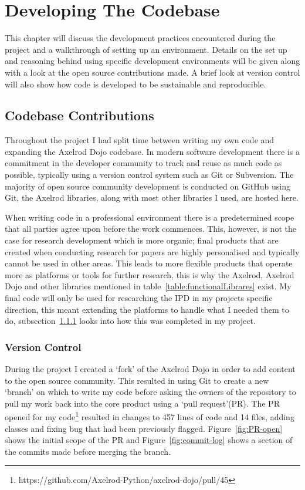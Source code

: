 \chapter{Developing The Codebase}\label{ch:developingthecodebase}
This chapter will discuss the development practices encountered during the project and a walkthrough of setting up an environment.
Details on the set up and reasoning behind using specific development environments will be given along with a look at the open source contributions made.
A brief look at version control will also show how code is developed to be sustainable and reproducible.

\section{Codebase Contributions}
Throughout the project I had split time between writing my own code and expanding the Axelrod Dojo codebase. 
In modern software development there is a commitment in the developer community to track and reuse as much code as possible, typically using a version control system such as Git or Subversion.
The majority of open source community development is conducted on GitHub\cite{GitHub} using Git, the Axelrod libraries, along with most other libraries I used, are hosted here.

When writing code in a professional environment there is a predetermined scope that all parties agree upon before the work commences.  This, however, is not the case for research development which is more organic;
final products that are created when conducting research for papers are highly personalised and typically cannot be used in other areas.
This leads to more flexible products that operate more as platforms or tools for further research, this is why the Axelrod, Axelrod Dojo and other libraries mentioned in table~\ref{table:functionalLibrares} exist.
My final code will only be used for researching the IPD in my projects specific direction, this meant extending the platforms to handle what I needed them to do, subsection~\ref{ssec:versioncontrol} looks into how this was completed in my project.

\subsection{Version Control}\label{ssec:versioncontrol}
During the project I created a `fork' of the Axelrod Dojo in order to add content to the open source community. 
This resulted in using Git to create a new `branch' on which to write my code before asking the owners of the repository to pull my work back into the core product using a `pull request'(PR).
The PR opened for my code\footnote{https://github.com/Axelrod-Python/axelrod-dojo/pull/45} resulted in changes to 457 lines of code and 14 files, adding classes and fixing bug that had been previously flagged.
Figure~\ref{fig:PR-open} shows the initial scope of the PR and Figure~\ref{fig:commit-log} shows a section of the commits made before merging the branch.

